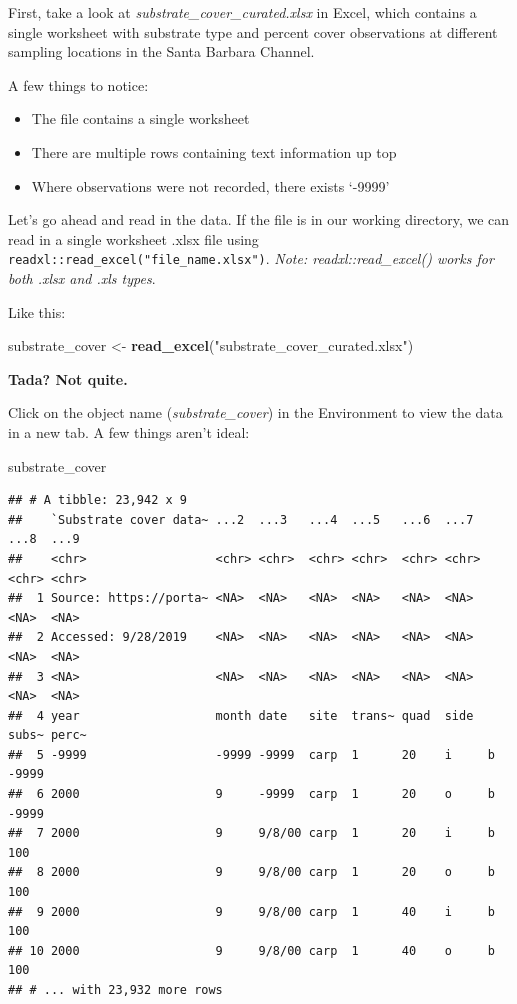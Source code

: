 \documentclass[]{book}
\newenvironment{Shaded}{\begin{snugshade}}{\end{snugshade}}
\newcommand{\KeywordTok}[1]{\textcolor[rgb]{0.13,0.29,0.53}{\textbf{#1}}}
\newcommand{\NormalTok}[1]{#1}
\newcommand{\StringTok}[1]{\textcolor[rgb]{0.31,0.60,0.02}{#1}}
\providecommand{\tightlist}{%
  \setlength{\itemsep}{0pt}\setlength{\parskip}{0pt}}
\begin{document}
First, take a look at \emph{substrate\_cover\_curated.xlsx} in Excel, which contains a single worksheet with substrate type and percent cover observations at different sampling locations in the Santa Barbara Channel.

A few things to notice:

\begin{itemize}
\tightlist
\item
  The file contains a single worksheet
\item
  There are multiple rows containing text information up top
\item
  Where observations were not recorded, there exists `-9999'
\end{itemize}

Let's go ahead and read in the data. If the file is in our working directory, we can read in a single worksheet .xlsx file using \texttt{readxl::read\_excel("file\_name.xlsx")}. \emph{Note: readxl::read\_excel() works for both .xlsx and .xls types}.

Like this:

\begin{Shaded}
\begin{Highlighting}[]
\NormalTok{substrate_cover <-}\StringTok{ }\KeywordTok{read_excel}\NormalTok{(}\StringTok{"substrate_cover_curated.xlsx"}\NormalTok{)}
\end{Highlighting}
\end{Shaded}

\textbf{Tada? Not quite.}

Click on the object name (\emph{substrate\_cover}) in the Environment to view the data in a new tab. A few things aren't ideal:

\begin{Shaded}
\begin{Highlighting}[]
\NormalTok{substrate_cover}
\end{Highlighting}
\end{Shaded}

\begin{verbatim}
## # A tibble: 23,942 x 9
##    `Substrate cover data~ ...2  ...3   ...4  ...5   ...6  ...7  ...8  ...9 
##    <chr>                  <chr> <chr>  <chr> <chr>  <chr> <chr> <chr> <chr>
##  1 Source: https://porta~ <NA>  <NA>   <NA>  <NA>   <NA>  <NA>  <NA>  <NA> 
##  2 Accessed: 9/28/2019    <NA>  <NA>   <NA>  <NA>   <NA>  <NA>  <NA>  <NA> 
##  3 <NA>                   <NA>  <NA>   <NA>  <NA>   <NA>  <NA>  <NA>  <NA> 
##  4 year                   month date   site  trans~ quad  side  subs~ perc~
##  5 -9999                  -9999 -9999  carp  1      20    i     b     -9999
##  6 2000                   9     -9999  carp  1      20    o     b     -9999
##  7 2000                   9     9/8/00 carp  1      20    i     b     100  
##  8 2000                   9     9/8/00 carp  1      20    o     b     100  
##  9 2000                   9     9/8/00 carp  1      40    i     b     100  
## 10 2000                   9     9/8/00 carp  1      40    o     b     100  
## # ... with 23,932 more rows
\end{verbatim}
\end{document}
